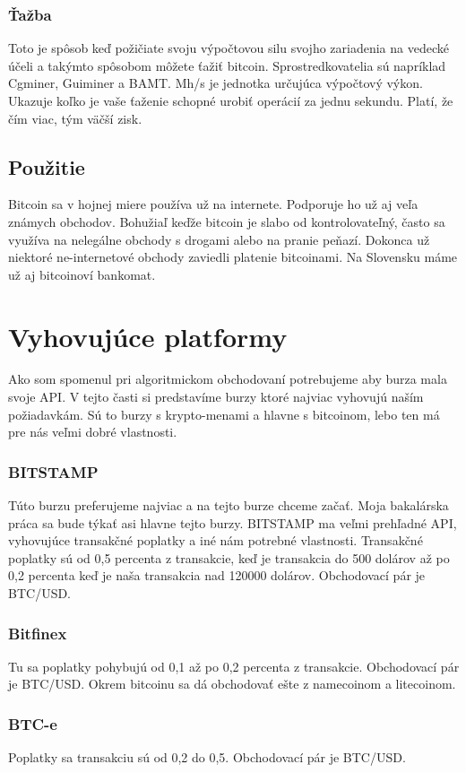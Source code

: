 \subsubsection{Ťažba} 
Toto je spôsob keď požičiate svoju výpočtovou silu svojho zariadenia na vedecké účeli a takýmto spôsobom môžete ťažiť bitcoin. 
 Sprostredkovatelia sú napríklad  Cgminer, Guiminer a BAMT. Mh/s je jednotka určujúca výpočtový výkon. Ukazuje koľko je vaše ťaženie schopné urobiť operácií za jednu sekundu. Platí, že čím viac, tým väčší zisk.
\subsection{Použitie} 
Bitcoin sa v hojnej miere používa už na internete. Podporuje ho už aj veľa známych obchodov. Bohužiaľ keďže bitcoin je slabo od kontrolovateľný, často sa využíva na nelegálne obchody s drogami alebo na pranie peňazí. Dokonca už niektoré ne-internetové obchody zaviedli platenie bitcoinami. Na Slovensku máme už aj bitcoinoví bankomat. 
\cite{B} 
\section{Vyhovujúce platformy} 
Ako som spomenul pri algoritmickom obchodovaní potrebujeme  aby burza mala svoje API. V tejto časti si predstavíme burzy ktoré najviac vyhovujú naším požiadavkám. Sú to burzy s krypto-menami a hlavne s bitcoinom, lebo ten má pre nás veľmi dobré vlastnosti. 
\subsubsection{BITSTAMP} 
Túto burzu preferujeme najviac a na tejto burze chceme začať. Moja bakalárska práca sa bude týkať asi hlavne tejto burzy. BITSTAMP ma veľmi prehľadné API, vyhovujúce transakčné poplatky a iné nám potrebné vlastnosti. Transakčné poplatky sú od 0,5 percenta z transakcie, keď je transakcia do 500 dolárov až po 0,2 percenta keď je naša transakcia nad 120000 dolárov. Obchodovací pár je BTC/USD. \cite{Bit} 
\subsubsection{Bitfinex} 
Tu sa poplatky pohybujú od 0,1 až po 0,2 percenta z transakcie. Obchodovací pár je BTC/USD. Okrem bitcoinu sa dá obchodovať ešte z namecoinom a litecoinom. \cite{Bitf} 
\subsubsection{BTC-e} 
Poplatky sa transakciu sú od 0,2 do 0,5. Obchodovací pár je BTC/USD. \cite{BTC} 
